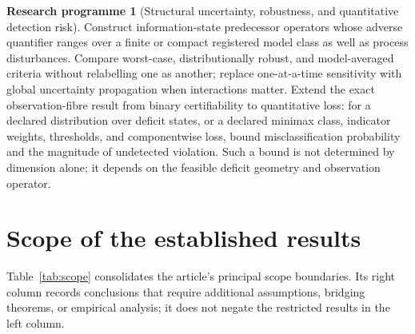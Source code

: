\documentclass[11pt]{article}
\theoremstyle{definition}
\newtheorem{programme}{Research programme}
\begin{document}
\begin{programme}[Structural uncertainty, robustness, and quantitative detection risk]
Construct information-state predecessor operators whose adverse quantifier ranges over a finite or compact registered model class as well as process disturbances. Compare worst-case, distributionally robust, and model-averaged criteria without relabelling one as another; replace one-at-a-time sensitivity with global uncertainty propagation when interactions matter. Extend the exact observation-fibre result from binary certifiability to quantitative loss: for a declared distribution over deficit states, or a declared minimax class, indicator weights, thresholds, and componentwise loss, bound misclassification probability and the magnitude of undetected violation. Such a bound is not determined by dimension alone; it depends on the feasible deficit geometry and observation operator.
\end{programme}

\section{Scope of the established results}

Table~\ref{tab:scope} consolidates the article's principal scope boundaries. Its right column records conclusions that require additional assumptions, bridging theorems, or empirical analysis; it does not negate the restricted results in the left column.
\end{document}
